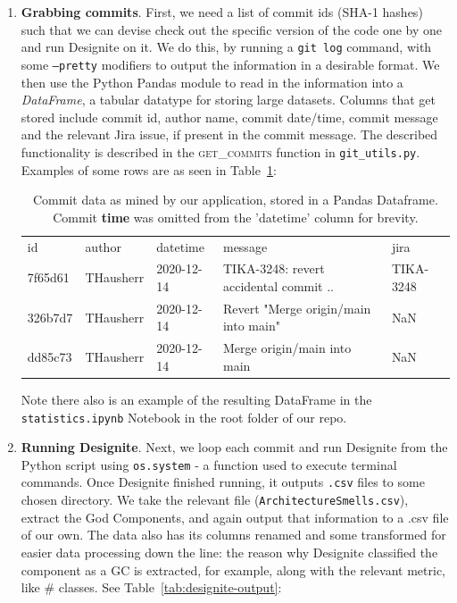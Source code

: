 \documentclass{article}
\begin{document}
\begin{enumerate}
    \item \textbf{Grabbing commits}. First, we need a list of commit ids (SHA-1 hashes) such that we can devise check out the specific version of the code one by one and run Designite on it. We do this, by running a \texttt{git log} command, with some \texttt{--pretty} modifiers to output the information in a desirable format. We then use the Python Pandas \citep{mckinney2011pandas} module to read in the information into a \textit{DataFrame}, a tabular datatype for storing large datasets. Columns that get stored include commit id, author name, commit date/time, commit message and the relevant Jira issue, if present in the commit message. The described functionality is described in the \textsc{get\_commits} function in \texttt{git\_utils.py}. Examples of some rows are as seen in Table~\ref{tab:commits-example}:
    
    \begin{table}[ht]
    \begin{tabular}{lllll}
    id                                       & author    & datetime                  & message                                       & jira      \\
    7f65d61 & THausherr & 2020-12-14 & TIKA-3248: revert accidental commit .. & TIKA-3248 \\
    326b7d7 & THausherr & 2020-12-14 & Revert "Merge origin/main into main"          & NaN       \\
    dd85c73 & THausherr & 2020-12-14 & Merge origin/main into main                   & NaN      
    \end{tabular}
    \caption{Commit data as mined by our application, stored in a Pandas Dataframe. Commit \textbf{time} was omitted from the 'datetime' column for brevity.}
    \label{tab:commits-example}
    \end{table}
    
    Note there also is an example of the resulting DataFrame in the \texttt{statistics.ipynb} Notebook in the root folder of our repo.
    
    \item \textbf{Running Designite}. Next, we loop each commit and run Designite from the Python script using \texttt{os.system} - a function used to execute terminal commands. Once Designite finished running, it outputs \texttt{.csv} files to some chosen directory. We take the relevant file (\texttt{ArchitectureSmells.csv}), extract the God Components, and again output that information to a .csv file of our own. The data also has its columns renamed and some transformed for easier data processing down the line: the reason why Designite classified the component as a GC is extracted, for example, along with the relevant metric, like \# classes. See Table~\ref{tab:designite-output}:
    

\end{enumerate}
\end{document}
